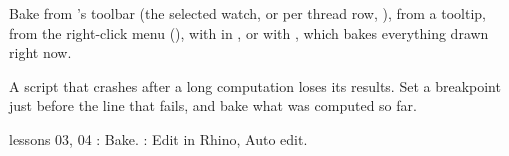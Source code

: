 Bake from 's toolbar (the selected watch, or per thread row, ), from a tooltip,
from the right-click menu (), with  in , or with
, which bakes everything drawn right now.

\begin{tip}
A script that crashes after a long computation loses its results. Set a breakpoint just before the line
that fails, and bake what was computed so far.
\end{tip}

\begin{lesson}{lessons 03, 04}
: Bake. : Edit in Rhino, Auto edit.
\end{lesson}

